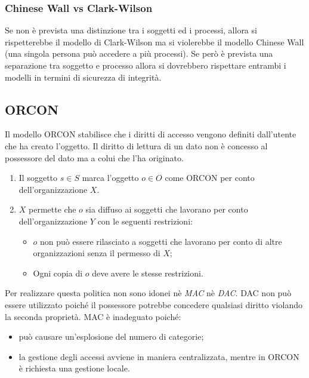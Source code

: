 \subsubsection{Chinese Wall vs Clark-Wilson}

Se non è prevista una distinzione tra i soggetti
ed i processi, allora si rispetterebbe il modello
di Clark-Wilson ma si violerebbe il modello
Chinese Wall (una singola persona può
accedere a più processi). Se però è prevista
una separazione tra soggetto e processo allora
si dovrebbero rispettare entrambi i modelli in
termini di sicurezza di integrità.

\subsection{ORCON \normalfont{}}

Il modello ORCON stabilisce che i diritti di accesso vengono definiti
dall'utente che ha creato l'oggetto. Il diritto di lettura di un dato non è
concesso al possessore del dato ma a colui che l'ha
originato.

\begin{enumerate}
    \item Il soggetto \(s \in S\) marca l'oggetto \(o \in O\) come ORCON per
          conto dell'organizzazione \(X\).
    \item \(X\) permette che \(o\) sia diffuso ai soggetti che lavorano per
          conto dell'organizzazione \(Y\) con le seguenti restrizioni:
          \begin{itemize}
              \item \(o\) non può essere rilasciato a soggetti che lavorano per
                    conto di altre organizzazioni senza il permesso di \(X\);
              \item Ogni copia di \(o\) deve avere le stesse restrizioni.
          \end{itemize}
\end{enumerate}

Per realizzare questa politica non sono idonei nè \textit{MAC} nè \textit{DAC}.
DAC non può essere utilizzato poiché il possessore potrebbe concedere qualsiasi
diritto violando la seconda proprietà.
MAC è inadeguato poiché:

\begin{itemize}
    \item può causare un'esplosione del numero di categorie;
    \item la gestione degli accessi avviene in maniera centralizzata,
          mentre in ORCON è richiesta
          una gestione locale.
\end{itemize}

